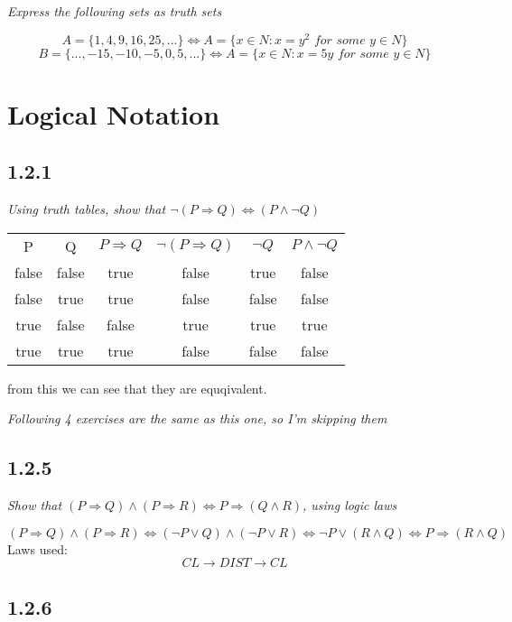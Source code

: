 \documentclass[11pt,oneside,titlepage]{book}
\DeclareMathOperator \lra {\Leftrightarrow}
\DeclareMathOperator \eqv {\Leftrightarrow}
\DeclareMathOperator \ra {\Rightarrow}
\DeclareMathOperator \imp {\Rightarrow}
\begin{document}
\textit{Express the following sets as truth sets}

$$A = \{1, 4, 9, 16, 25, ...\} \iff A = \{x \in N: x = y^2 \textit{ for some } y \in N\}$$
$$B = \{..., -15, -10, -5, 0, 5, ... \} \iff A = \{x \in N: x = 5y  \textit{ for some } y \in N\}$$

\section{Logical Notation}

\subsection*{1.2.1}

\textit{Using truth tables, show that $\neg(P \ra Q) \lra (P \land \neg Q)$}

\begin{center}
  \begin{tabular}{c| c| c| c| c| c|}
    P & Q & $P \ra Q$ & $\neg(P \ra Q)$ & $\neg Q$ & $P \land \neg Q$ \\
    false & false & true & false & true & false \\
    false & true & true & false & false & false \\
    true & false & false & true & true & true \\
    true & true & true & false & false & false \\
  \end{tabular}  
\end{center}

from this we can see that they are equqivalent.

\textit{Following 4 exercises are the same as this one, so I'm skipping them}

\subsection*{1.2.5}

\textit{Show that $(P \imp Q) \land (P \imp R) \eqv P \imp (Q \land R)$, using logic laws}

$$(P \imp Q) \land (P \imp R) \eqv (\neg P \lor Q) \land (\neg P \lor R) \eqv
\neg P  \lor (R \land Q) \eqv  P  \imp (R \land Q) $$
Laws used: 
$$CL \to DIST \to CL$$

\subsection*{1.2.6}
\end{document}
